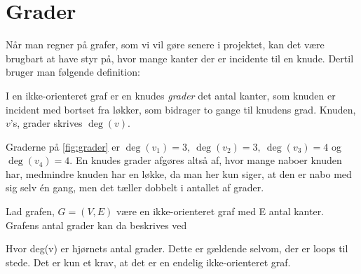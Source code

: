 \section{Grader} \label{sec:grader}
Når man regner på grafer, som vi vil gøre senere i projektet, kan det være brugbart at have styr på, hvor mange kanter der er incidente til en knude. Dertil bruger man følgende definition:

\begin{defn}[Grader] \label{defn:grader}
I en ikke-orienteret graf er en knudes \emph{grader} det antal kanter, som knuden er incident med bortset fra løkker, som bidrager to gange til knudens grad. Knuden, $v$'s, grader skrives $\deg(v)$.
\end{defn}

\begin{exmp} \label{ex:grader}

Graderne på \autoref{fig:grader} er $\deg(v_{1})=3, \ \deg(v_{2})=3, \ \deg(v_{3})=4$ og $\deg(v_{4})=4$. En knudes grader afgøres altså af, hvor mange naboer knuden har, medmindre knuden har en løkke, da man her kun siger, at den er nabo med sig selv én gang, men det tæller dobbelt i antallet af grader.


\end{exmp}

\begin{thm}
Lad grafen, $G = (V,E)$ være en ikke-orienteret graf med E antal kanter. Grafens antal grader kan da beskrives ved 

Hvor deg(v) er hjørnets antal grader. Dette er gældende selvom, der er loops til stede. Det er kun et krav, at det er en endelig ikke-orienteret graf.

\end{thm}